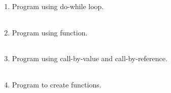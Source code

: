 \documentclass{exam}
\begin{document}
\begin{enumerate}
   \item  Program  using do-while loop.

   \begin{myTableStyle}
   \begin{center} \begin{tabular}{ |m{14cm}| } \hline
              \\ \hline
    \end{tabular} \end{center}
\end{myTableStyle}
  \pagebreak

   \item  Program  using  function.

   \begin{myTableStyle}
   \begin{center} \begin{tabular}{ |m{14cm}| } \hline
              \\ \hline
    \end{tabular} \end{center}
\end{myTableStyle}
  \pagebreak

   \item  Program  using  call-by-value and call-by-reference.

   \begin{myTableStyle}
   \begin{center} \begin{tabular}{ |m{14cm}| } \hline
              \\ \hline
    \end{tabular} \end{center}
\end{myTableStyle}
  \pagebreak

   \item  Program  to create functions.

   \begin{myTableStyle}
   \begin{center} \begin{tabular}{ |m{14cm}| } \hline
              \\ \hline
    \end{tabular} \end{center}
\end{myTableStyle}
  \pagebreak


\end{enumerate}
\end{document}
